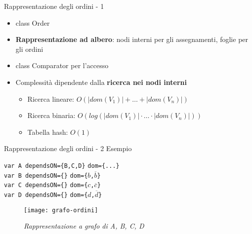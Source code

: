 \begin{frame}{Rappresentazione degli ordini - 1}
\begin{itemize}
  \item class Order
  \item \textbf{Rappresentazione ad albero}: nodi interni per gli assegnamenti, foglie per gli ordini
  \pause
  \item class Comparator per l'accesso
  \item Complessità dipendente dalla \textbf{ricerca nei nodi interni}
  \begin{itemize}
  	\item Ricerca lineare: $O(|dom(V_1)|+\ldots+|dom(V_n)|)$
  	\item Ricerca binaria: $O(log(|dom(V_1)|\cdot \ldots \cdot|dom(V_n)|))$
  	\item Tabella hash:    $O(1)$
  \end{itemize}
\end{itemize}
\end{frame}

\begin{frame}{Rappresentazione degli ordini - 2}
Esempio

\texttt{var A dependsON=\{B,C,D\}}  \texttt{dom=\{...\}}\\
\texttt{var B dependsON=\{\}}       \texttt{dom=\{$b$,$\overline{b}$\}}\\
\texttt{var C dependsON=\{\}}       \texttt{dom=\{$c$,$\overline{c}$\}}\\
\texttt{var D dependsON=\{\}}       \texttt{dom=\{$d$,$\overline{d}$\}}\\
\begin{center}
  \begin{figure}[ht]
    \centering
    \texttt{[image: grafo-ordini]}
    \caption{\textit{Rappresentazione a grafo di A, B, C, D}}
  \end{figure}
\end{center}
\end{frame}